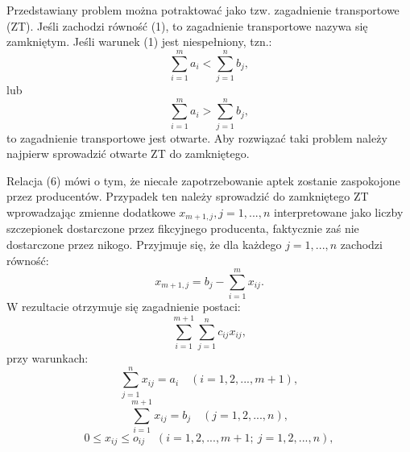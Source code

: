\documentclass[11pt]{article}
\begin{document}
Przedstawiany problem można potraktować jako tzw. zagadnienie transportowe (ZT). Jeśli zachodzi równość (1), to zagadnienie transportowe nazywa się zamkniętym.
Jeśli warunek (1) jest niespełniony, tzn.:
\begin{equation}
    \sum\limits_{i=1}^{m} a_{i} < \sum\limits_{j=1}^n b_{j},
\end{equation}
lub
\begin{equation}
    \sum\limits_{i=1}^{m} a_{i} > \sum\limits_{j=1}^n b_{j},
\end{equation}
to zagadnienie transportowe jest otwarte. Aby rozwiązać taki problem należy najpierw sprowadzić otwarte ZT do zamkniętego.

Relacja (6) mówi o tym, że niecałe zapotrzebowanie aptek zostanie zaspokojone przez producentów. Przypadek ten należy sprowadzić do zamkniętego ZT wprowadzając zmienne dodatkowe $x_{m+1,j}, j = 1,..., n$ interpretowane jako liczby szczepionek dostarczone przez fikcyjnego producenta, faktycznie zaś nie dostarczone przez nikogo. Przyjmuje się, że dla każdego $j=1,..., n$ zachodzi równość:
\begin{equation}
    x_{m+1,j}=b_{j}-\sum\limits_{i=1}^{m} x_{ij}.
\end{equation}
W rezultacie otrzymuje się zagadnienie postaci:
\begin{equation}
    \sum\limits_{i=1}^{m+1}\sum\limits_{j=1}^{n}c_{ij}x_{ij},
\end{equation}
przy warunkach:
\begin{equation}
    \sum\limits_{j=1}^{n} x_{ij} = a_{i} \quad (i = 1, 2,..., m+1),
\end{equation}
\begin{equation}
    \sum\limits_{i=1}^{m+1} x_{ij} = b_{j} \quad (j = 1, 2,..., n),
\end{equation}
\begin{equation}
    0 \leq x_{ij} \leq o_{ij} \quad (i = 1, 2,..., m+1; \ j = 1, 2,..., n),
\end{equation}
\end{document}
